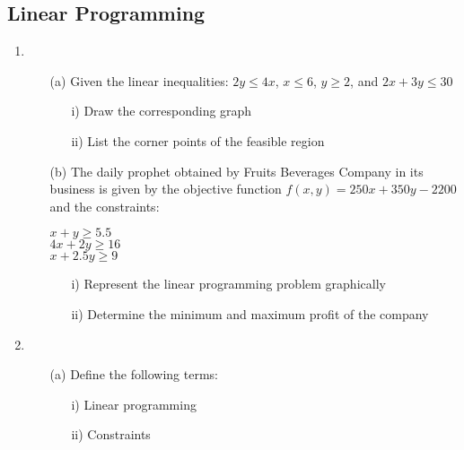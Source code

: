 \subsection{Linear Programming}

\begin{enumerate}
	\item 
	\begin{enumerate}[topsep=0ex,itemsep=0ex,partopsep=1ex,parsep=1ex]
		\item[(a)] Given the linear inequalities: $2y \leq 4x$, $x \leq 6$, $y \geq 2$, and $2x + 3y \leq 30$
		\begin{enumerate}[topsep=0ex,itemsep=0ex,partopsep=1ex,parsep=1ex]
			\item[i)] Draw the corresponding graph
			\item[ii)] List the corner points of the feasible region
		\end{enumerate}
		
		\item[(b)] The daily prophet obtained by Fruits Beverages Company in its business is given by the objective function $f(x,y) = 250x + 350y - 2200$ and the constraints:
		\begin{center}
			$x + y \geq 5.5$ \\
			$4x + 2y \geq 16$ \\
			$x + 2.5y \geq 9$ 
		\end{center}
		\begin{enumerate}[topsep=0ex,itemsep=0ex,partopsep=1ex,parsep=1ex]
			\item[i)] Represent the linear programming problem graphically
			\item[ii)] Determine the minimum and maximum profit of the company
		\end{enumerate}
	\end{enumerate}
	
	\item
	\begin{enumerate}[topsep=0ex,itemsep=0ex,partopsep=1ex,parsep=1ex]
		\item[(a)] Define the following terms:
		\begin{enumerate}[topsep=0ex,itemsep=0ex,partopsep=1ex,parsep=1ex]
			\item[i)] Linear programming
			\item[ii)] Constraints
		\end{enumerate}
		

\end{enumerate}
\end{enumerate}

